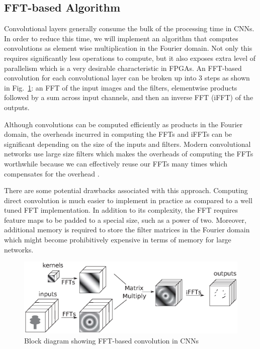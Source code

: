 \documentclass[conference,compsoc]{IEEEtran/IEEEtran}
\begin{document}
\subsection{FFT-based Algorithm}
Convolutional layers generally consume the bulk of the processing time in CNNs. In order to reduce this time, we will implement an algorithm that computes convolutions as element wise multiplication in the Fourier domain. Not only this requires significantly less operations to compute, but it also exposes extra level of parallelism which is a very desirable characteristic in FPGAs. An FFT-based convolution for each convolutional layer can be broken up into $3$ steps as shown in Fig.~\ref{CNN-FFT}: an FFT of the input images and the filters, elementwise products followed by a sum across input channels, and then an inverse FFT (iFFT) of the outputs.

Although convolutions can be computed efficiently as products in the Fourier domain, the overheads incurred in computing the FFTs and iFFTs can be significant depending on the size of the inputs and filters. Modern convolutional networks use large size filters which makes the overheads of computing the FFTs worthwhile because we can effectively reuse our FFTs many times which compensates for the overhead \cite{FFT1}.

There are some potential drawbacks associated with this approach. Computing direct convolution is much easier to implement in practice as compared to a well tuned FFT implementation. In addition to its complexity, the FFT requires feature maps to be padded to a special size, such as a power of two. Moreover, additional memory is required to store the filter matrices in the Fourier domain which might become prohibitively expensive in terms of memory for large networks.

\begin{figure}[!h]
\begin{center}
\centering
\includegraphics[width=1\columnwidth]{CNN-FFT.eps}
\caption{Block diagram showing FFT-based convolution in CNNs}
\label{CNN-FFT}
\end{center}
\end{figure}
\end{document}
